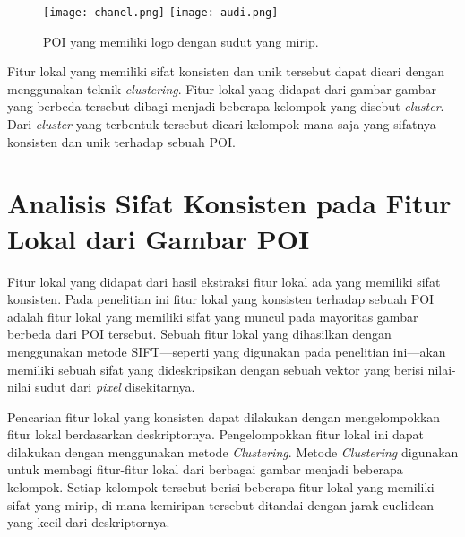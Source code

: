 \begin{figure}[H]
	\centering
	\texttt{[image: chanel.png]}
	\texttt{[image: audi.png]}
	\caption{POI yang memiliki logo dengan sudut yang mirip.}
	\label{fig:logo_tidak_unik}
\end{figure}

Fitur lokal yang memiliki sifat konsisten dan unik tersebut dapat dicari dengan menggunakan teknik \textit{clustering}. Fitur lokal yang didapat dari gambar-gambar yang berbeda tersebut dibagi menjadi beberapa kelompok yang disebut \textit{cluster}. Dari \textit{cluster} yang terbentuk tersebut dicari kelompok mana saja yang sifatnya konsisten dan unik terhadap sebuah POI. 

\section{Analisis Sifat Konsisten pada Fitur Lokal dari Gambar POI}
\label{sec:analisis_konsistensi}
Fitur lokal yang didapat dari hasil ekstraksi fitur lokal ada yang memiliki sifat konsisten. Pada penelitian ini fitur lokal yang konsisten terhadap sebuah POI adalah fitur lokal yang memiliki sifat yang muncul pada mayoritas gambar berbeda dari POI tersebut. Sebuah fitur lokal yang dihasilkan dengan menggunakan metode SIFT---seperti yang digunakan pada penelitian ini---akan memiliki sebuah sifat yang dideskripsikan dengan sebuah vektor yang berisi nilai-nilai sudut dari \textit{pixel} disekitarnya. 

Pencarian fitur lokal yang konsisten dapat dilakukan dengan mengelompokkan fitur lokal berdasarkan deskriptornya. Pengelompokkan fitur lokal ini dapat dilakukan dengan menggunakan metode \textit{Clustering}. Metode \textit{Clustering} digunakan untuk membagi fitur-fitur lokal dari berbagai gambar menjadi beberapa kelompok. Setiap kelompok tersebut berisi beberapa fitur lokal yang memiliki sifat yang mirip, di mana kemiripan tersebut ditandai dengan jarak euclidean yang kecil dari deskriptornya. 

